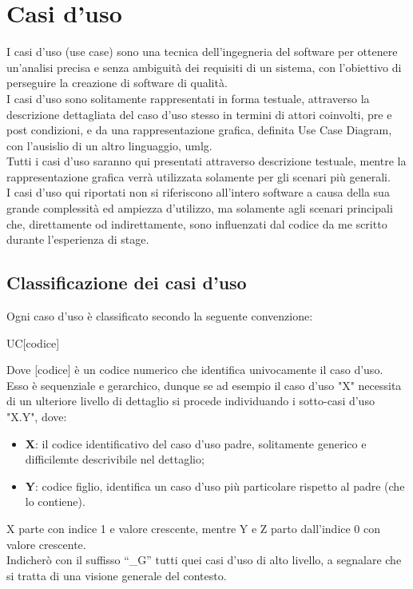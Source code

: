 \section{Casi d'uso}
I casi d'uso (use case) sono una tecnica dell'ingegneria del software per ottenere un'analisi precisa e senza ambiguità dei requisiti di un sistema, con l'obiettivo di perseguire la creazione di software di qualità.\\
I casi d'uso sono solitamente rappresentati in forma testuale, attraverso la descrizione dettagliata del caso d'uso stesso in termini di attori coinvolti, pre e post condizioni, e da una rappresentazione grafica, definita Use Case Diagram, con l'ausislio di un altro linguaggio, \gls{umlg}.\\
Tutti i casi d'uso saranno qui presentati attraverso descrizione testuale, mentre la rappresentazione grafica verrà utilizzata solamente per gli scenari più generali.\\
I casi d'uso qui riportati non si riferiscono all'intero software a causa della sua grande complessità ed ampiezza d'utilizzo, ma solamente agli scenari principali che, direttamente od indirettamente, sono influenzati dal codice da me scritto durante l'esperienza di stage.\\

\newpage

\subsection{Classificazione dei casi d'uso}
Ogni caso d’uso è classificato secondo la seguente convenzione:
\begin{center}
	UC[codice]
\end{center}
Dove [codice] è un codice numerico che identifica univocamente il caso d’uso.\\
Esso è sequenziale e gerarchico, dunque se ad esempio il caso d’uso "X" necessita di un ulteriore livello di dettaglio si procede individuando i sotto-casi d’uso "X.Y", dove:\\
\begin{itemize}
	\item \textbf{X}: il codice identificativo del caso d'uso padre, solitamente generico e difficilemte descrivibile nel dettaglio; 
	\item \textbf{Y}: codice figlio, identifica un caso d'uso più particolare rispetto al padre (che lo contiene).
	
\end{itemize}
X parte con indice 1 e valore crescente, mentre Y e Z parto dall'indice 0 con valore crescente.\\
Indicherò con il suffisso “\_G” tutti quei casi d’uso di alto livello, a segnalare che si tratta di una visione generale del contesto.

